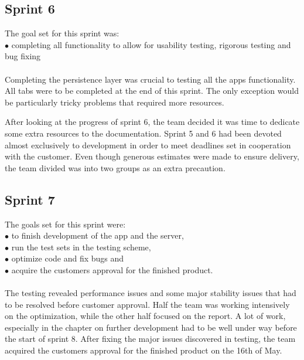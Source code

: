 \subsection{Sprint 6}
The goal set for this sprint was:\\
$\bullet$\hspace{0.25cm} completing all functionality to allow for usability testing, rigorous testing and bug fixing\\\\
Completing the persistence layer was crucial to testing all the apps functionality. All tabs were to be completed at the end of this sprint. The only exception would be particularly tricky problems that required more resources.

After looking at the progress of sprint 6, the team decided it was time to dedicate some extra resources to the documentation. Sprint 5 and 6 had been devoted almost exclusively to development in order to meet deadlines set in cooperation with the customer. Even though generous estimates were made to ensure delivery, the team divided was into two groups as an extra precaution. 

\subsection{Sprint 7}
The goals set for this sprint were:\\
$\bullet$\hspace{0.25cm} to finish development of the app and the server,\\
$\bullet$\hspace{0.25cm} run the test sets in the testing scheme,\\
$\bullet$\hspace{0.25cm} optimize code and fix bugs and\\
$\bullet$\hspace{0.25cm} acquire the customers approval for the finished product.\\\\
The testing revealed performance issues and some major stability issues that had to be resolved before customer approval. Half the team was working intensively on the optimization, while the other half focused on the report. A lot of work, especially in the chapter on further development had to be well under way before the start of sprint 8. After fixing the major issues discovered in testing, the team acquired the customers approval for the finished product on the 16th of May.

